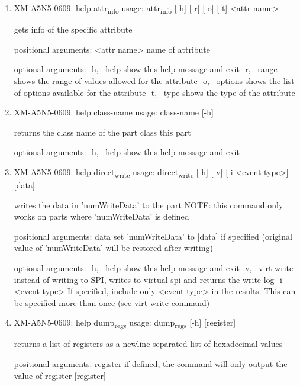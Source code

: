 \documentclass[11pt]{article}
\begin{document}
\begin{enumerate}
\item XM-A5N5-0609: help attr\textsubscript{info}
\label{sec:orgb64137c}
usage: attr\textsubscript{info} [-h] [-r] [-o] [-t] <attr name>

gets info of the specific attribute

positional arguments:
  <attr name>    name of attribute

optional arguments:
  -h, --help     show this help message and exit
  -r, --range    shows the range of values allowed for the attribute
  -o, --options  shows the list of options available for the attribute
  -t, --type     shows the type of the attribute

\item XM-A5N5-0609: help class-name
\label{sec:org68d4a98}
usage: class-name [-h]

returns the class name of the part class this part

optional arguments:
  -h, --help  show this help message and exit

\item XM-A5N5-0609: help direct\textsubscript{write}
\label{sec:orgbb30f06}
usage: direct\textsubscript{write} [-h] [-v] [-i <event type>] [data]

writes the data in 'numWriteData' to the part NOTE: this command only works on
parts where 'numWriteData' is defined

positional arguments:
  data              set 'numWriteData' to [data] if specified (original value
                    of 'numWriteData' will be restored after writing)

optional arguments:
  -h, --help        show this help message and exit
  -v, --virt-write  instead of writing to SPI, writes to virtual spi and
                    returns the write log
  -i <event type>   If specified, include only <event type> in the results.
                    This can be specified more than once (see virt-write
                    command)

\item XM-A5N5-0609: help dump\textsubscript{regs}
\label{sec:org2cc8626}
usage: dump\textsubscript{regs} [-h] [register]

returns a list of registers as a newline separated list of hexadecimal values

positional arguments:
  register    if defined, the command will only output the value of register
              [register]


\end{enumerate}
\end{document}
